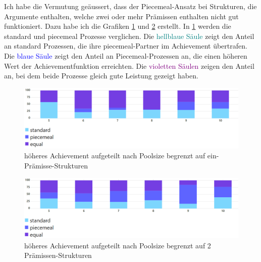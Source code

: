 \documentclass{article}
\begin{document}
Ich habe die Vermutung geäussert, dass der Piecemeal-Ansatz bei Strukturen, die Argumente enthalten, welche zwei oder mehr Prämissen enthalten nicht gut funktioniert. Dazu habe ich die Grafiken \ref{fig:höheres Achievement aufgeteilt nach Poolsize begrenzt auf eine Prämisse} und \ref{fig:höheres Achievement aufgeteilt nach Poolsize begrenzt auf max 2 Prämissen} erstellt. In \ref{fig:höheres Achievement aufgeteilt nach Poolsize begrenzt auf eine Prämisse} werden die standard und piecemeal Prozesse verglichen. Die \textcolor{teal}{hellblaue Säule} zeigt den Anteil an standard Prozessen, die ihre piecemeal-Partner im Achievement übertrafen. Die \textcolor{blue}{blaue Säule} zeigt den Anteil an Piecemeal-Prozessen an, die einen höheren Wert der Achievementfunktion erreichten. Die \textcolor{purple}{violetten Säulen} zeigen den Anteil an, bei dem beide Prozesse gleich gute Leistung gezeigt haben.

\begin{figure}[ht]
  \centering
  \includegraphics[width=\textwidth]{höheres Achievement aufgeteilt nach Poolsize begrenzt auf eine Prämisse}
  \caption{höheres Achievement aufgeteilt nach Poolsize begrenzt auf ein-Prämisse-Strukturen\label{fig:höheres Achievement aufgeteilt nach Poolsize begrenzt auf eine Prämisse}}
\end{figure}

\begin{figure}[ht]
  \centering
  \includegraphics[width=\textwidth]{höheres Achievement aufgeteilt nach Poolsize begrenzt auf max 2 Prämissen}
  \caption{höheres Achievement aufgeteilt nach Poolsize begrenzt auf 2 Prämissen-Strukturen\label{fig:höheres Achievement aufgeteilt nach Poolsize begrenzt auf max 2 Prämissen}}
\end{figure}
\end{document}
